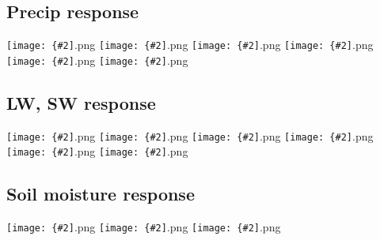 \documentclass[12pt,a4paper]{article}
\newcommand{\pngfig}[2][0.5]{\texttt{[image: \{\#2]}.png}}
\begin{document}
\subsection{Precip response}
\pngfig[0.5]{comp_precip_max}
\pngfig[0.5]{comp_precip_min}
\pngfig[0.5]{comp_rainconv_max}
\pngfig[0.5]{comp_rainconv_min}
\pngfig[0.5]{comp_rainlgsc_max}
\pngfig[0.5]{comp_rainlgsc_min}

\subsection{LW, SW response}

\pngfig[0.5]{comp_lwclsky_max}
\pngfig[0.5]{comp_lwclsky_min}
\pngfig[0.5]{comp_dlwr_max}
\pngfig[0.5]{comp_dlwr_min}
\pngfig[0.5]{comp_dswr_max}
\pngfig[0.5]{comp_dswr_min}

\subsection{Soil moisture response}

\pngfig[0.5]{comp_smc_max}
\pngfig[0.5]{comp_smc_min}
\pngfig[0.5]{smc_clim}
\end{document}
